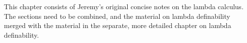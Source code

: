 \documentclass[../../../include/open-logic-chapter]{subfiles}
\begin{document}

\begin{editorial}
This chapter consists of Jeremy's original concise notes on the lambda
calculus. The sections need to be combined, and the material on lambda
definability merged with the material in the separate, more detailed
chapter on lambda definability.
\end{editorial}














\OLEndChapterHook
\end{document}
